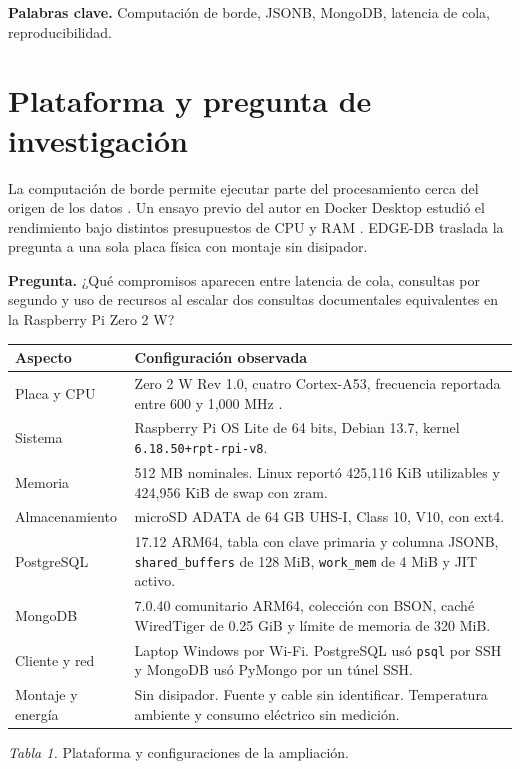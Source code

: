 \documentclass[10pt,a4paper]{article}
\newcommand{\clave}[1]{\texttt{#1}}
\begin{document}
\textbf{Palabras clave.} Computación de borde, JSONB, MongoDB, latencia de cola, reproducibilidad.
\tableofcontents

\clearpage
\section{Plataforma y pregunta de investigación}
La computación de borde permite ejecutar parte del procesamiento cerca del origen de los datos \cite{nist}. Un ensayo previo del autor en Docker Desktop estudió el rendimiento bajo distintos presupuestos de CPU y RAM \cite{antecedente}. EDGE-DB traslada la pregunta a una sola placa física con montaje sin disipador.

\textbf{Pregunta.} ¿Qué compromisos aparecen entre latencia de cola, consultas por segundo y uso de recursos al escalar dos consultas documentales equivalentes en la Raspberry Pi Zero 2 W?

\begin{center}
\small
\begin{tabularx}{.98\linewidth}{@{}lX@{}}
\toprule Aspecto & Configuración observada\\
\midrule
Placa y CPU & Zero 2 W Rev 1.0, cuatro Cortex-A53, frecuencia reportada entre 600 y 1,000 MHz \cite{pi,arm}.\\
Sistema & Raspberry Pi OS Lite de 64 bits, Debian 13.7, kernel \clave{6.18.50+rpt-rpi-v8}.\\
Memoria & 512 MB nominales. Linux reportó 425,116 KiB utilizables y 424,956 KiB de swap con zram.\\
Almacenamiento & microSD ADATA de 64 GB UHS-I, Class 10, V10, con ext4.\\
PostgreSQL & 17.12 ARM64, tabla con clave primaria y columna JSONB, \clave{shared\_buffers} de 128 MiB, \clave{work\_mem} de 4 MiB y JIT activo.\\
MongoDB & 7.0.40 comunitario ARM64, colección con BSON, caché WiredTiger de 0.25 GiB y límite de memoria de 320 MiB.\\
Cliente y red & Laptop Windows por Wi-Fi. PostgreSQL usó \clave{psql} por SSH y MongoDB usó PyMongo por un túnel SSH.\\
Montaje y energía & Sin disipador. Fuente y cable sin identificar. Temperatura ambiente y consumo eléctrico sin medición.\\
\bottomrule
\end{tabularx}
\par\smallskip\textit{Tabla 1.} Plataforma y configuraciones de la ampliación.
\end{center}
\end{document}
